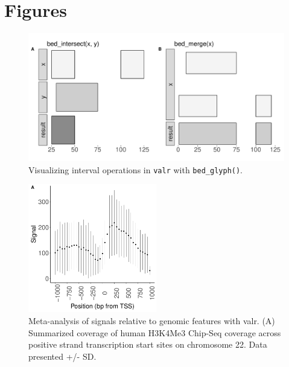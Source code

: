 \documentclass[9pt,a4paper]{extarticle}
\begin{document}
{\small
}

\section*{Figures}


\begin{figure}[!htb]
\centering
\includegraphics[width=1\textwidth]{figure1.pdf}
\caption{\label{fig:Figure 1}Visualizing interval operations in \texttt{valr} with \texttt{bed\_glyph()}.}
\end{figure}


\begin{figure}[!htb]
\centering
\includegraphics[width=0.5\textwidth]{figure2.pdf}
\caption{\label{fig:Figure 2}Meta-analysis of signals relative to genomic features with valr. \textnormal{(A) Summarized coverage of human H3K4Me3 Chip-Seq coverage across positive strand transcription start sites on chromosome 22. Data presented +/- SD.}}
\end{figure}
\end{document}
